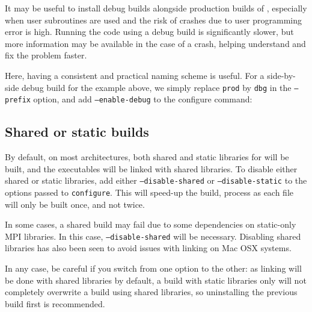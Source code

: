 \documentclass[a4paper,10pt,twoside]{csshortdoc}
\begin{document}
It may be useful to install debug builds alongside production
builds of \CS, especially when user subroutines are used
and the risk of crashes due to user programming error is high.
Running the code using a debug build is significantly
slower, but more information may be available in the case
of a crash, helping understand and fix the problem faster.

Here, having a consistent and practical naming scheme is useful.
For a side-by-side debug build for the example above, we simply replace \texttt{prod} by
\texttt{dbg} in the \texttt{--prefix} option, and add
\texttt{--enable-debug} to the configure command:


\subsection{Shared or static builds\label{sec:config:shared}}

By default, on most architectures, both shared and static libraries
for \CS will be built, and the executables will be linked with shared
libraries. To disable either shared or static libraries,
add either {\tt --disable-shared} or {\tt --disable-static}
to the options passed to {\tt configure}. This will speed-up the build,
process as each file will only be built once, and not twice.

In some cases, a shared build may fail due to some dependencies
on static-only MPI libraries. In this case, {\tt --disable-shared}
will be necessary. Disabling shared libraries has also been seen
to avoid issues with linking on Mac OSX systems.

In any case, be careful if you switch from one option to the other: as
linking will be done with shared libraries by default, a build
with static libraries only will not completely overwrite a build using
shared libraries, so uninstalling the previous build first
is recommended.
\end{document}
